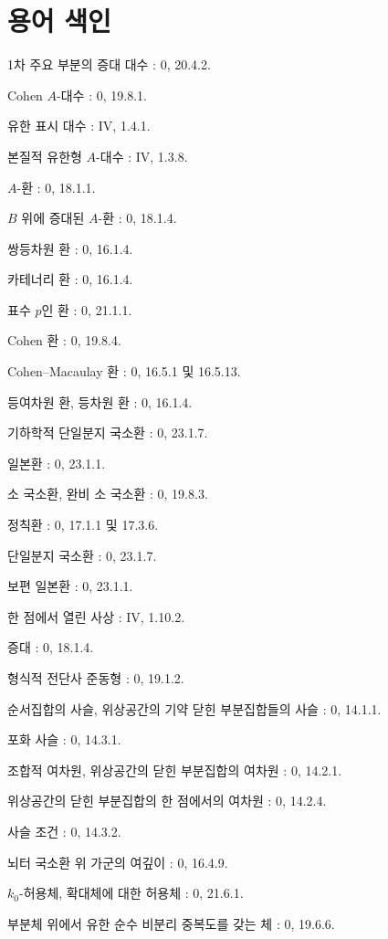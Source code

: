 \clearpage
{}
{}
\section*{용어 색인}

1차 주요 부분의 증대 대수 : 0, 20.4.2.\par
Cohen $A$-대수 : 0, 19.8.1.\par
유한 표시 대수 : IV, 1.4.1.\par
본질적 유한형 $A$-대수 : IV, 1.3.8.\par
$A$-환 : 0, 18.1.1.\par
$B$ 위에 증대된 $A$-환 : 0, 18.1.4.\par
쌍등차원 환 : 0, 16.1.4.\par
카테너리 환 : 0, 16.1.4.\par
표수 $p$인 환 : 0, 21.1.1.\par
Cohen 환 : 0, 19.8.4.\par
Cohen--Macaulay 환 : 0, 16.5.1 및 16.5.13.\par
등여차원 환, 등차원 환 : 0, 16.1.4.\par
기하학적 단일분지 국소환 : 0, 23.1.7.\par
일본환 : 0, 23.1.1.\par
소 국소환, 완비 소 국소환 : 0, 19.8.3.\par
정칙환 : 0, 17.1.1 및 17.3.6.\par
단일분지 국소환 : 0, 23.1.7.\par
보편 일본환 : 0, 23.1.1.\par
한 점에서 열린 사상 : IV, 1.10.2.\par
증대 : 0, 18.1.4.\par

형식적 전단사 준동형 : 0, 19.1.2.\par

순서집합의 사슬, 위상공간의 기약 닫힌 부분집합들의 사슬 : 0, 14.1.1.\par
포화 사슬 : 0, 14.3.1.\par
조합적 여차원, 위상공간의 닫힌 부분집합의 여차원 : 0, 14.2.1.\par
위상공간의 닫힌 부분집합의 한 점에서의 여차원 : 0, 14.2.4.\par
사슬 조건 : 0, 14.3.2.\par
뇌터 국소환 위 가군의 여깊이 : 0, 16.4.9.\par
$k_0$-허용체, 확대체에 대한 허용체 : 0, 21.6.1.\par
부분체 위에서 유한 순수 비분리 중복도를 갖는 체 : 0, 19.6.6.\par

